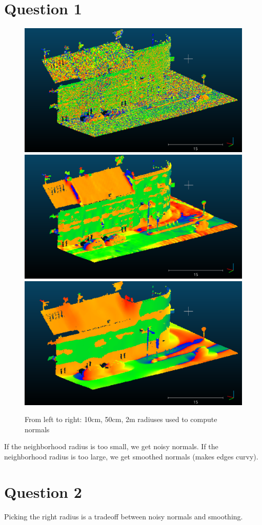 \documentclass[a4paper]{article}
\begin{document}





\section*{Question 1}
\begin{figure}[ht]
  \centering
  \includegraphics[width=0.3\linewidth]{figures/cc_normals_10cm.png}
  \includegraphics[width=0.3\linewidth]{figures/cc_normals_50cm.png}
  \includegraphics[width=0.3\linewidth]{figures/cc_normals_2m.png}
  
  \caption{From left to right: 10cm, 50cm, 2m radiuses used to compute normals}
  \label{fig:cc_normals}
\end{figure}
If the neighborhood radius is too small, we get noisy normals.
If the neighborhood radius is too large, we get smoothed normals (makes edges curvy).


\section*{Question 2}
Picking the right radius is a tradeoff between noisy normals and smoothing.
\end{document}
